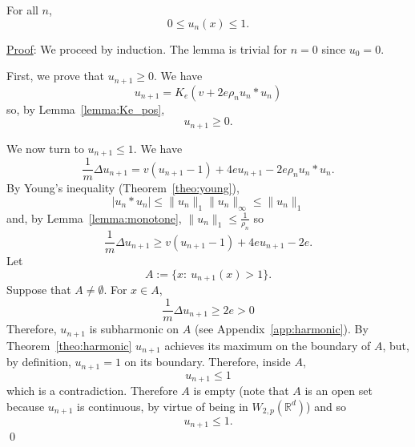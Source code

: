 \documentclass{ian}
\begin{document}
\label{lemma:bound}
  For all $n$,
  \nopagebreakaftereq
  \begin{equation}
    0\leqslant u_n(x)\leqslant 1
    .
  \end{equation}
\endtheo
\restorepagebreakaftereq
\bigskip

\indent\underline{Proof}:
  We proceed by induction.
  The lemma is trivial for $n=0$ since $u_0=0$.
  \bigskip

  \point
  First, we prove that $u_{n+1}\geqslant 0$.
  We have
  \begin{equation}
    u_{n+1}=K_e(v+2e\rho_n u_n\ast u_n)
  \end{equation}
  so, by Lemma\-~\ref{lemma:Ke_pos},
  \begin{equation}
    u_{n+1}\geqslant 0
    .
  \end{equation}
  \bigskip

  \point
  We now turn to $u_{n+1}\leqslant 1$.
  We have
  \begin{equation}
    \frac1m\Delta u_{n+1}=v(u_{n+1}-1)+4eu_{n+1}-2e\rho_n u_n\ast u_n
    .
  \end{equation}
  By Young's inequality (Theorem\-~\ref{theo:young}),
  \begin{equation}
    |u_n\ast u_n|\leqslant\|u_n\|_1\|u_n\|_\infty
    \leqslant\|u_n\|_1
  \end{equation}
  and, by Lemma\-~\ref{lemma:monotone}, $\|u_n\|_1\leqslant\frac1{\rho_n}$ so
  \begin{equation}
    \frac1m\Delta u_{n+1}\geqslant
    v(u_{n+1}-1)+4eu_{n+1}-2e
    .
  \end{equation}
  Let
  \begin{equation}
    A:=\{x:\ u_{n+1}(x)>1\}
    .
  \end{equation}
  Suppose that $A\neq\emptyset$.
  For $x\in A$,
  \begin{equation}
    \frac1m\Delta u_{n+1}
    \geqslant2e>0
  \end{equation}
  Therefore, $u_{n+1}$ is subharmonic on $A$ (see Appendix\-~\ref{app:harmonic}).
  By Theorem\-~\ref{theo:harmonic} $u_{n+1}$ achieves its maximum on the boundary of $A$, but, by definition, $u_{n+1}=1$ on its boundary.
  Therefore, inside $A$,
  \begin{equation}
    u_{n+1}\leqslant 1
  \end{equation}
  which is a contradiction.
  Therefore $A$ is empty (note that $A$ is an open set because $u_{n+1}$ is continuous, by virtue of being in $W_{2,p}(\mathbb R^d)$) and so
  \begin{equation}
    u_{n+1}\leqslant 1
    .
  \end{equation}
\qed
\bigskip
\end{document}
